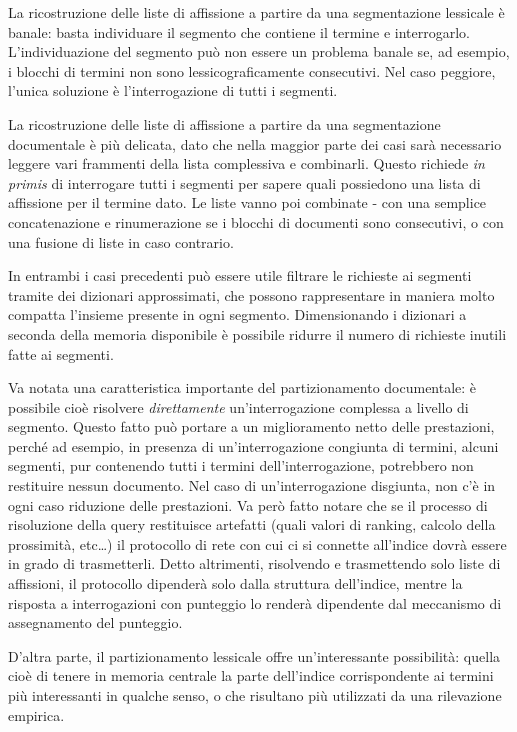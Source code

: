 La ricostruzione delle liste di affissione a partire da una segmentazione lessicale è banale: basta individuare il segmento che contiene il termine e interrogarlo. L'individuazione del segmento può non essere un problema banale se, ad esempio, i blocchi di termini non sono lessicograficamente consecutivi. Nel caso peggiore, l'unica soluzione è l'interrogazione di tutti i segmenti.

La ricostruzione delle liste di affissione a partire da una segmentazione documentale è più delicata, dato che nella maggior parte dei casi sarà necessario leggere vari frammenti della lista complessiva e combinarli. Questo richiede \textit{in primis} di interrogare tutti i segmenti per sapere quali possiedono una lista di affissione per il termine dato. Le liste vanno poi combinate - con una semplice concatenazione e rinumerazione se i blocchi di documenti sono consecutivi, o con una fusione di liste in caso contrario.

In entrambi i casi precedenti può essere utile filtrare le richieste ai segmenti tramite dei dizionari approssimati, che possono rappresentare in maniera molto compatta l'insieme presente in ogni segmento. Dimensionando i dizionari a seconda della memoria disponibile è possibile ridurre il numero di richieste inutili fatte ai segmenti.

Va notata una caratteristica importante del partizionamento documentale: è possibile cioè risolvere \textit{direttamente} un'interrogazione complessa a livello di segmento. Questo fatto può portare a un miglioramento netto delle prestazioni, perché ad esempio, in presenza di un'interrogazione congiunta di termini, alcuni segmenti, pur contenendo tutti i termini dell'interrogazione, potrebbero non restituire nessun documento. Nel caso di un'interrogazione disgiunta, non c'è in ogni caso riduzione delle prestazioni. Va però fatto notare che se il processo di risoluzione della query restituisce artefatti (quali valori di ranking, calcolo della prossimità, etc\dots) il protocollo di rete con cui ci si connette all'indice dovrà essere in grado di trasmetterli. Detto altrimenti, risolvendo e trasmettendo solo liste di affissioni, il protocollo dipenderà solo dalla struttura dell'indice, mentre la risposta a interrogazioni con punteggio lo renderà dipendente dal meccanismo di assegnamento del punteggio.

D'altra parte, il partizionamento lessicale offre un'interessante possibilità: quella cioè di tenere in memoria centrale la parte dell'indice corrispondente ai termini più interessanti in qualche senso, o che risultano più utilizzati da una rilevazione empirica.
